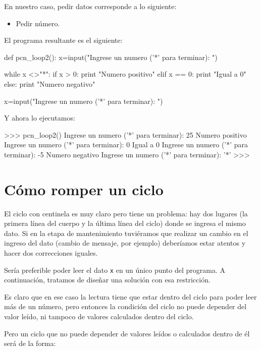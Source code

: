 En nuestro caso, pedir datos corresponde a lo siguiente:

\begin{itemize}
\item Pedir número.
\end{itemize}

El programa resultante es el siguiente:

\begin{codigo-python}
def pcn_loop2():
    x=input("Ingrese un numero ('*' para terminar): ")

    while x <>"*":
        if x > 0:
            print "Numero positivo"
        elif x == 0:
            print "Igual a 0"
        else:
            print "Numero negativo"

        x=input("Ingrese un numero ('*' para terminar): ")
\end{codigo-python}

Y ahora lo ejecutamos:

\begin{codigo-python-sn}
>>> pcn_loop2()
Ingrese un numero ('*' para terminar): 25
Numero positivo
Ingrese un numero ('*' para terminar): 0
Igual a 0
Ingrese un numero ('*' para terminar): -5
Numero negativo
Ingrese un numero ('*' para terminar): '*'
>>>
\end{codigo-python-sn}

\section{Cómo romper un ciclo}

El ciclo con centinela es muy claro pero tiene un problema: hay dos lugares
(la primera línea del cuerpo y la última línea del ciclo) donde se ingresa
el mismo dato. Si en la etapa de mantenimiento tuviéramos que realizar un
cambio en el ingreso del dato (cambio de mensaje, por ejemplo) deberíamos
estar atentos y hacer dos correcciones iguales.

Sería preferible poder leer el dato \lstinline!x! en un único punto del
programa.  A continuación, tratamos de diseñar una solución con esa
restricción.

Es claro que en ese caso la lectura tiene que estar dentro del ciclo para
poder leer más de un número, pero entonces la condición del ciclo no puede
depender del valor leído, ni tampoco de valores calculados dentro del
ciclo.

Pero un ciclo que no puede depender de valores leídos o calculados dentro
de él será de la forma:

